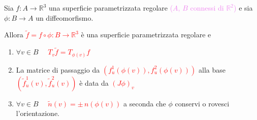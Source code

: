         \newpage
        \begin{proposizione}
        \label{prop:parametrizzazioni_equivalenti}
        Sia $f \colon A \to \mathbb{R}^3$ una superficie parametrizzata regolare \textcolor{violet}{($A$, $B$ connessi di $\mathbb{R}^2$)}
        e sia $\phi \colon B \to A$ un diffeomorfismo. 
        
        Allora \textcolor{red}{$\tilde{f} = f \circ \phi \colon B \to \mathbb{R}^3$} è una superficie parametrizzata regolare e 
        \begin{enumerate}
            \item $\forall v \in B \quad$ \textcolor{red}{$T_v \tilde{f} = T_{\phi(v)} f$}
            \item La matrice di passaggio da \textcolor{red}{$\left(f_u^1(\phi(v)),f_u^2(\phi(v)) \right)$} alla base 
            \textcolor{red}{$\left(\tilde{f}_u^1(v),\tilde{f}_u^2(v)\right)$} è data da \textcolor{red}{$\left(J \phi\right)_v$}
            \item $\forall v \in B \quad$ \textcolor{red}{$\tilde{n}(v)= \pm \, n(\phi(v))$} a seconda che $\phi$ conservi o rovesci l'orientazione.
        \end{enumerate}
        \end{proposizione}
